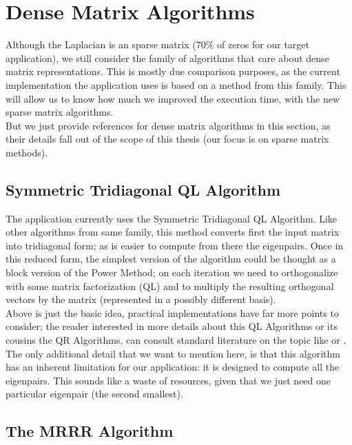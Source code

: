 \section{Dense Matrix Algorithms}

Although the \gls{Laplacian} is an sparse matrix (70\% of zeros for our
target application), we still consider the family of algorithms that
care about dense matrix representations. This is mostly due comparison
purposes, as the current implementation the application uses is
based on a method from this family. This will allow us to know how
much we improved the execution time, with the new sparse matrix
algorithms. \\

But we just provide references for 
dense matrix algorithms in this section, as their details fall out of the scope of
this thesis (our focus is on sparse matrix methods). \\

\subsection{Symmetric Tridiagonal QL Algorithm}
The application currently uses the Symmetric Tridiagonal QL
Algorithm. Like other algorithms from same family, this method
converts first the input matrix into tridiagonal form; as is easier to
compute from there the eigenpairs. Once in this reduced form, the
simplest version of the algorithm could be thought as a block
version of the Power Method; on each iteration we need to
orthogonalize with some matrix factorization (QL) and to multiply the
resulting orthogonal vectors by the matrix (represented in a possibly
different basis). \\

Above is just the basic idea, practical implementations have far
more points to consider; the reader interested in more details about
this QL Algorithms or its cousins the QR Algorithms, can consult
standard literature on the topic like \cite{golub13} or
\cite{parlett80}. The only additional detail that we want to mention
here, is that this algorithm has an inherent limitation for our
application: it is designed to compute all the eigenpairs. This sounds
like a waste of resources, given that we just need one particular
eigenpair (the second smallest). 

\subsection{The \gls{MRRR} Algorithm}

